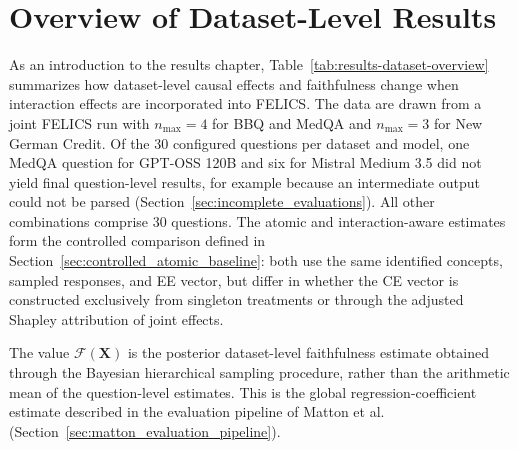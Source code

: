 \section{Overview of Dataset-Level Results}
\label{sec:results-overview}

As an introduction to the results chapter, Table~\ref{tab:results-dataset-overview} summarizes how dataset-level causal effects and faithfulness change when interaction effects are incorporated into FELICS. The data are drawn from a joint FELICS run with $n_{\max}=4$ for BBQ and MedQA and $n_{\max}=3$ for New German Credit. Of the 30 configured questions per dataset and model, one MedQA question for GPT-OSS 120B and six for Mistral Medium 3.5 did not yield final question-level results, for example because an intermediate output could not be parsed (Section~\ref{sec:incomplete_evaluations}). All other combinations comprise 30 questions. The atomic and interaction-aware estimates form the controlled comparison defined in Section~\ref{sec:controlled_atomic_baseline}: both use the same identified concepts, sampled responses, and EE vector, but differ in whether the CE vector is constructed exclusively from singleton treatments or through the adjusted Shapley attribution of joint effects.

The value $\mathcal{F}(\mathbf{X})$ is the posterior dataset-level faithfulness estimate obtained through the Bayesian hierarchical sampling procedure, rather than the arithmetic mean of the question-level estimates. This is the global regression-coefficient estimate described in the evaluation pipeline of Matton et al.~\cite{mattonWalkTalkMeasuring2024} (Section~\ref{sec:matton_evaluation_pipeline}).

